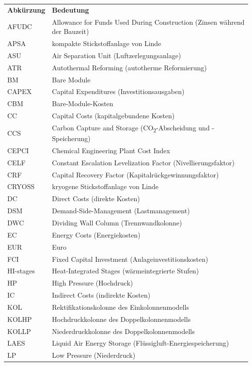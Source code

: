 \begin{longtable}{p{3cm}p{11cm}}
\textbf{Abkürzung} & \textbf{Bedeutung} \\
\addlinespace[0.5em]
AFUDC & Allowance for Funds Used During Construction (Zinsen während der Bauzeit) \\
APSA & kompakte Stickstoffanlage von Linde \\
ASU & Air Separation Unit (Luftzerlegungsanlage) \\
ATR & Autothermal Reforming (autotherme Reformierung) \\
BM & Bare Module \\
CAPEX & Capital Expenditures (Investitionsausgaben) \\
CBM & Bare-Module-Kosten \\
CC & Capital Costs (kapitalgebundene Kosten) \\
CCS & Carbon Capture and Storage (CO\textsubscript{2}-Abscheidung und -Speicherung) \\
CEPCI & Chemical Engineering Plant Cost Index \\
CELF & Constant Escalation Levelization Factor (Nivellierungsfaktor) \\
CRF & Capital Recovery Factor (Kapitalrückgewinnungsfaktor) \\
CRYOSS & kryogene Stickstoffanlage von Linde \\
DC & Direct Costs (direkte Kosten) \\
DSM & Demand-Side-Management (Lastmanagement) \\
DWC & Dividing Wall Column (Trennwandkolonne) \\
EC & Energy Costs (Energiekosten) \\
EUR & Euro \\
FCI & Fixed Capital Investment (Anlageinvestitionskosten) \\
HI-stages & Heat-Integrated Stages (wärmeintegrierte Stufen) \\
HP & High Pressure (Hochdruck) \\
IC & Indirect Costs (indirekte Kosten) \\
KOL & Rektifikationskolonne des Einkolonnenmodells \\
KOLHP & Hochdruckkolonne des Doppelkolonnenmodells \\
KOLLP & Niederdruckkolonne des Doppelkolonnenmodells \\
LAES & Liquid Air Energy Storage (Flüssigluft-Energiespeicherung) \\
LP & Low Pressure (Niederdruck) \\

\end{longtable}
